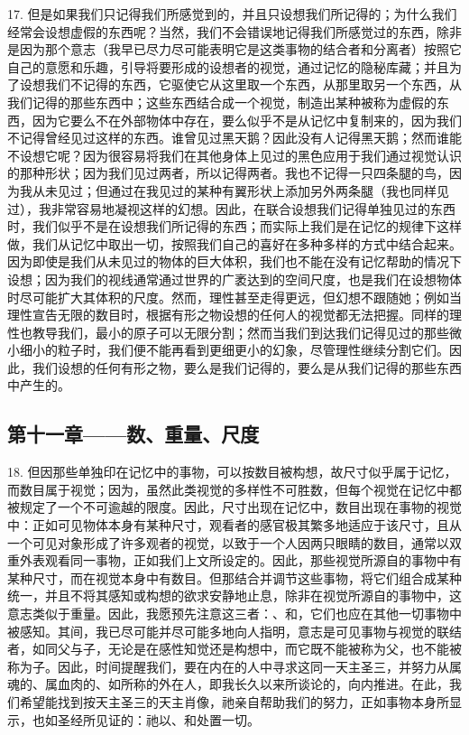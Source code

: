 17. 但是如果我们只记得我们所感觉到的，并且只设想我们所记得的；为什么我们经常会设想虚假的东西呢？当然，我们不会错误地记得我们所感觉过的东西，除非是因为那个意志（我早已尽力尽可能表明它是这类事物的结合者和分离者）按照它自己的意愿和乐趣，引导将要形成的设想者的视觉，通过记忆的隐秘库藏；并且为了设想我们不记得的东西，它驱使它从这里取一个东西，从那里取另一个东西，从我们记得的那些东西中；这些东西结合成一个视觉，制造出某种被称为虚假的东西，因为它要么不在外部物体中存在，要么似乎不是从记忆中复制来的，因为我们不记得曾经见过这样的东西。谁曾见过黑天鹅？因此没有人记得黑天鹅；然而谁能不设想它呢？因为很容易将我们在其他身体上见过的黑色应用于我们通过视觉认识的那种形状；因为我们见过两者，所以记得两者。我也不记得一只四条腿的鸟，因为我从未见过；但通过在我见过的某种有翼形状上添加另外两条腿（我也同样见过），我非常容易地凝视这样的幻想。因此，在联合设想我们记得单独见过的东西时，我们似乎不是在设想我们所记得的东西；而实际上我们是在记忆的规律下这样做，我们从记忆中取出一切，按照我们自己的喜好在多种多样的方式中结合起来。因为即使是我们从未见过的物体的巨大体积，我们也不能在没有记忆帮助的情况下设想；因为我们的视线通常通过世界的广袤达到的空间尺度，也是我们在设想物体时尽可能扩大其体积的尺度。然而，理性甚至走得更远，但幻想不跟随她；例如当理性宣告无限的数目时，根据有形之物设想的任何人的视觉都无法把握。同样的理性也教导我们，最小的原子可以无限分割；然而当我们到达我们记得见过的那些微小细小的粒子时，我们便不能再看到更细更小的幻象，尽管理性继续分割它们。因此，我们设想的任何有形之物，要么是我们记得的，要么是从我们记得的那些东西中产生的。\par


\subsection{第十一章——数、重量、尺度}

18. 但因那些单独印在记忆中的事物，可以按数目被构想，故尺寸似乎属于记忆，而数目属于视觉；因为，虽然此类视觉的多样性不可胜数，但每个视觉在记忆中都被规定了一个不可逾越的限度。因此，尺寸出现在记忆中，数目出现在事物的视觉中：正如可见物体本身有某种尺寸，观看者的感官极其繁多地适应于该尺寸，且从一个可见对象形成了许多观者的视觉，以致于一个人因两只眼睛的数目，通常以双重外表观看同一事物，正如我们上文所设定的。因此，那些视觉所源自的事物中有某种尺寸，而在视觉本身中有数目。但那结合并调节这些事物，将它们组合成某种统一，并且不将其感知或构想的欲求安静地止息，除非在视觉所源自的事物中，这意志类似于重量。因此，我愿预先注意这三者：、和，它们也应在其他一切事物中被感知。其间，我已尽可能并尽可能多地向人指明，意志是可见事物与视觉的联结者，如同父与子，无论是在感性知觉还是构想中，而它既不能被称为父，也不能被称为子。因此，时间提醒我们，要在内在的人中寻求这同一天主圣三，并努力从属魂的、属血肉的、如所称的外在人，即我长久以来所谈论的，向内推进。在此，我们希望能找到按天主圣三的天主肖像，祂亲自帮助我们的努力，正如事物本身所显示，也如圣经所见证的：祂以、和处置一切。\par

